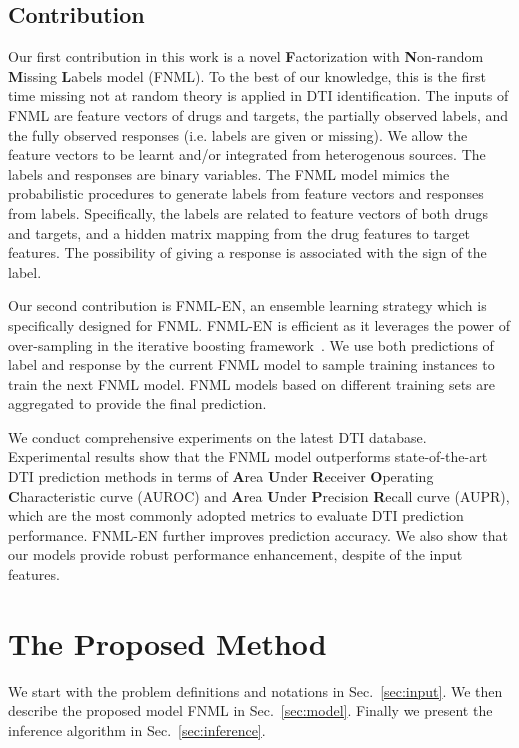 \documentclass[journal]{IEEEtran}
\begin{document}
\subsection{Contribution}

Our first contribution in this work is a novel \textbf{F}actorization with \textbf{N}on-random \textbf{M}issing \textbf{L}abels model (FNML). To the best of our knowledge, this is the first time missing not at random theory is applied in DTI identification. The inputs of FNML are feature vectors of drugs and targets, the partially observed labels, and the fully observed responses (i.e. labels are given or missing). We allow the feature vectors to be learnt and/or integrated from heterogenous sources. The labels and responses are binary variables. The FNML model mimics the probabilistic procedures to generate labels from feature vectors and responses from labels. Specifically, the labels are related to feature vectors of both drugs and targets, and a hidden matrix mapping from the drug features to target features. The possibility of giving a response is associated with the sign of the label.

Our second contribution is FNML-EN, an ensemble learning strategy which is specifically designed for FNML. FNML-EN is efficient as it leverages the power of over-sampling in the iterative boosting framework~\cite{Boosting}. We use both predictions of label and response by the current FNML model to sample training instances to train the next FNML model.  FNML models based on different training sets are aggregated to provide the final prediction.

We conduct comprehensive experiments on the latest DTI database. Experimental results show that the FNML model outperforms state-of-the-art DTI prediction methods in terms of \textbf{A}rea \textbf{U}nder \textbf{R}eceiver \textbf{O}perating \textbf{C}haracteristic curve (AUROC) and \textbf{A}rea \textbf{U}nder \textbf{P}recision \textbf{R}ecall curve (AUPR), which are the most commonly adopted metrics to evaluate DTI prediction performance. FNML-EN further improves prediction accuracy. We also show that our models provide robust performance enhancement, despite of the input features.

\section{The Proposed Method}\label{sec:method}
We start with the problem definitions and notations in Sec.~\ref{sec:input}. We then describe the proposed model FNML in Sec.~\ref{sec:model}. Finally we present the inference algorithm in Sec.~\ref{sec:inference}.
\end{document}
